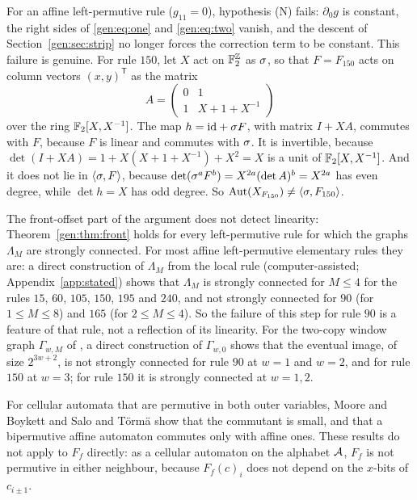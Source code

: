 \begin{remark}\label{pm:rem:linear}
For an affine left-permutive rule ($g_{11}=0$), hypothesis \textup{(N)} fails: $\partial_0g$ is constant, the right sides of \eqref{gen:eq:one} and \eqref{gen:eq:two} vanish, and the descent of Section~\ref{gen:sec:strip} no longer forces the correction term to be constant. This failure is genuine. For rule $150$, let $X$ act on $\mathbb{F}_2^{\mathbb{Z}}$ as $\sigma$, so that $F=F_{150}$ acts on column vectors $(x,y)^{\mathsf T}$ as the matrix
\[
A=\begin{pmatrix}0&1\\1&X+1+X^{-1}\end{pmatrix}
\]
over the ring $\mathbb{F}_2[X,X^{-1}]$. The map $h=\mathrm{id}+\sigma F$, with matrix $I+XA$, commutes with $F$, because $F$ is linear and commutes with $\sigma$. It is invertible, because $\det(I+XA)=1+X(X+1+X^{-1})+X^2=X$ is a unit of $\mathbb{F}_2[X,X^{-1}]$. And it does not lie in $\langle\sigma,F\rangle$, because $\det(\sigma^aF^b)=X^{2a}(\det A)^b=X^{2a}$ has even degree, while $\det h=X$ has odd degree. So $\operatorname{Aut}(X_{F_{150}})\ne\langle\sigma,F_{150}\rangle$.

The front-offset part of the argument does not detect linearity: Theorem~\ref{gen:thm:front} holds for every left-permutive rule for which the graphs $\Lambda_M$ are strongly connected. For most affine left-permutive elementary rules they are: a direct construction of $\Lambda_M$ from the local rule (computer-assisted; Appendix~\ref{app:stated}) shows that $\Lambda_M$ is strongly connected for $M\le4$ for the rules $15$, $60$, $105$, $150$, $195$ and $240$, and not strongly connected for $90$ (for $1\le M\le8$) and $165$ (for $2\le M\le4$). So the failure of this step for rule $90$ is a feature of that rule, not a reflection of its linearity. For the two-copy window graph $\Gamma_{w,M}$ of \cite{PaperBsupp}, a direct construction of $\Gamma_{w,0}$ shows that the eventual image, of size $2^{3w+2}$, is not strongly connected for rule $90$ at $w=1$ and $w=2$, and for rule $150$ at $w=3$; for rule $150$ it is strongly connected at $w=1,2$.

For cellular automata that are permutive in both outer variables, Moore and Boykett \cite{MooreBoykett1997} and Salo and T\"orm\"a \cite{SaloTorma2013} show that the commutant is small, and that a bipermutive affine automaton commutes only with affine ones. These results do not apply to $F_f$ directly: as a cellular automaton on the alphabet $\mathcal{A}$, $F_f$ is not permutive in either neighbour, because $F_f(c)_i$ does not depend on the $x$-bits of $c_{i\pm1}$.
\end{remark}
